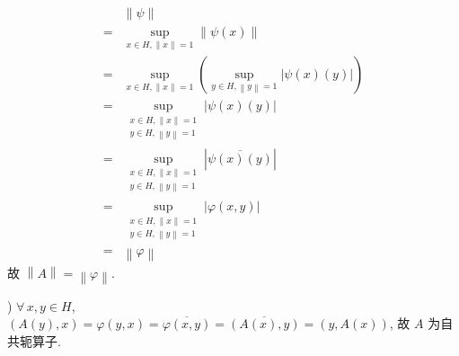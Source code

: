 \documentclass[../main.tex]{subfiles}
\begin{document}
\begin{align*}
     & \left\| \psi \right\| \\
    =& \sup_{x \in H, \left\| x \right\| = 1} \left\| \psi \left( x \right) \right\| \\
    =& \sup_{x \in H, \left\| x \right\| = 1} \left( \sup_{y \in H, \left\| y \right\| = 1} \left| \psi \left( x \right) \left( y \right) \right| \right) \\
    =& \sup_{\substack{x \in H, \left\| x \right\| = 1 \\ y \in H, \left\| y \right\| = 1}} \left| \psi \left( x \right) \left( y \right) \right| \\
    =& \sup_{\substack{x \in H, \left\| x \right\| = 1 \\ y \in H, \left\| y \right\| = 1}} \left| \overline{\psi \left( x \right) \left( y \right)} \right| \\
    =& \sup_{\substack{x \in H, \left\| x \right\| = 1 \\ y \in H, \left\| y \right\| = 1}} \left| \varphi \left( x, y \right) \right| \\
    =& \left\| \varphi \right\|
\end{align*}
故 $\left\| A \right\| = \left\| \varphi \right\|$.

)
$\forall \, x, y \in H$, $\left( A \left( y \right), x \right) = \varphi \left( y, x \right) = \overline{\varphi \left( x, y \right)} = \overline{\left( A \left( x \right), y \right)} = \left( y, A \left( x \right) \right)$, 故 $A$ 为自共轭算子.
\end{document}
